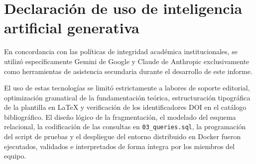 \documentclass[10pt,a4paper]{article}
\begin{document}
\section{Declaración de uso de inteligencia artificial generativa}

En concordancia con las políticas de integridad académica institucionales, se utilizó específicamente Gemini de Google y Claude de Anthropic 
exclusivamente como herramientas de asistencia secundaria durante el desarrollo de este informe. 

El uso de estas tecnologías se limitó estrictamente a labores de soporte editorial, optimización gramatical de la fundamentación teórica, 
estructuración tipográfica de la plantilla en \LaTeX{} y verificación de los identificadores DOI en el catálogo bibliográfico. El diseño 
lógico de la fragmentación, el modelado del esquema relacional, la codificación de las consultas en \texttt{03\_queries.sql}, la programación 
del script de pruebas y el despliegue del entorno distribuido en Docker fueron ejecutados, validados e interpretados de forma íntegra por los 
miembros del equipo.

\printbibliography
\end{document}
